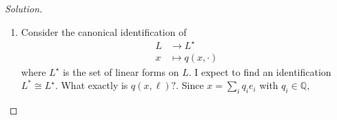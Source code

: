 \begin{proof}[Solution]\leavevmode
\begin{enumerate}[label=\alph*.]
	\item Consider the canonical identification of
		\begin{align*}
			L &\longrightarrow L^\star\\
			x &\longmapsto q(x,\cdot)
		\end{align*}
		where $L^\star$  is the set of linear forms on $L$. I expect to find an identification  $L^*\cong L^\star$. What exactly is $q(x,\ell)?$. Since $x=\sum_{i}q_ie_i$ with $q_i\in\mathbb{Q}$,
		
\end{enumerate}	
\end{proof}


